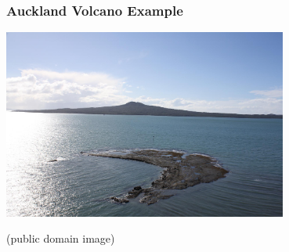 \documentclass{beamer}
\begin{document}
\begin{frame}
\frametitle{Auckland Volcano Example}

\centering
\includegraphics[width=0.7\textwidth]{images/rangitoto.jpg}

(public domain image)

\end{frame}
\end{document}
